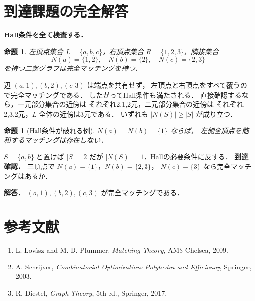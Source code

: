\documentclass[a5paper,10pt,onecolumn]{jsarticle}
\makeatletter
\theoremstyle{mathnotetheorem}
\newtheorem{proposition}[theorem]{命題}
\renewcommand{\proofname}{証明}
\renewenvironment{proof}[1][\proofname]{%
  \par\pushQED{\qed}\normalfont\topsep4\p@\@plus2\p@\relax
  \trivlist\item[\hskip\labelsep\bfseries #1]\ignorespaces
}{\popQED\endtrivlist\@endpefalse}
\makeatother
\begin{document}
\section{到達課題の完全解答}
\noindent\textbf{Hall条件を全て検査する．}
\begin{proposition}
左頂点集合 $L=\{a,b,c\}$，右頂点集合
$R=\{1,2,3\}$，隣接集合
\[
N(a)=\{1,2\},\quad N(b)=\{2\},\quad
N(c)=\{2,3\}
\]
を持つ二部グラフは完全マッチングを持つ．
\end{proposition}
\begin{proof}
辺 $(a,1),(b,2),(c,3)$ は端点を共有せず，
左頂点と右頂点をすべて覆うので完全マッチングである．
したがってHall条件も満たされる．
直接確認するなら，一元部分集合の近傍は
それぞれ2,1,2元，二元部分集合の近傍は
それぞれ2,3,2元，$L$ 全体の近傍は3元である．
いずれも $|N(S)|\ge|S|$ が成り立つ．
\end{proof}
\begin{proposition}[Hall条件が破れる例]
$N(a)=N(b)=\{1\}$ ならば，
左側全頂点を飽和するマッチングは存在しない．
\end{proposition}
\begin{proof}
$S=\{a,b\}$ と置けば $|S|=2$ だが
$|N(S)|=1$．Hallの必要条件に反する．
\end{proof}
\noindent\textbf{到達確認．}
三頂点で $N(a)=\{1\}$，$N(b)=\{2,3\}$，
$N(c)=\{3\}$ なら完全マッチングはあるか．
\par\noindent\textbf{解答．}
$(a,1),(b,2),(c,3)$ が完全マッチングである．
\section*{参考文献}
\begin{enumerate}
\item L. Lov\'asz and M. D. Plummer, \textit{Matching Theory}, AMS Chelsea, 2009.
\item A. Schrijver, \textit{Combinatorial Optimization: Polyhedra and Efficiency}, Springer, 2003.
\item R. Diestel, \textit{Graph Theory}, 5th ed., Springer, 2017.
\end{enumerate}
\end{document}

